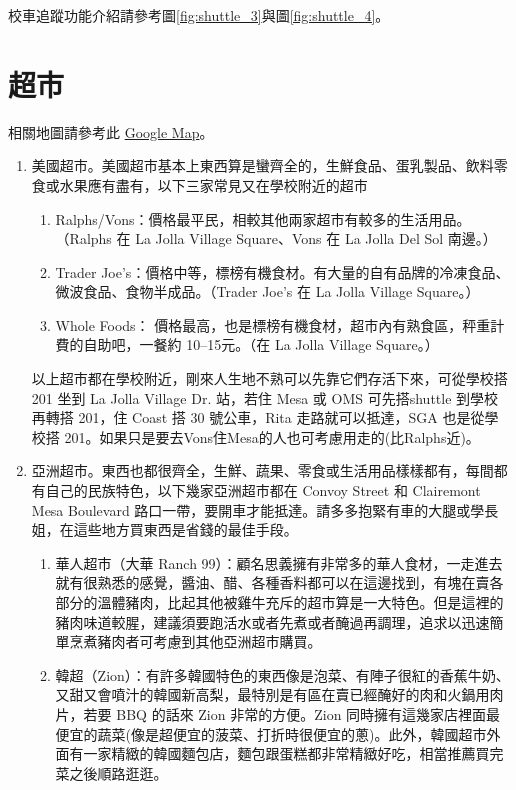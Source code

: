 \documentclass[10pt,a4paper]{book}
\begin{document}
\begin{CJK}{UTF8}{bkai}
校車追蹤功能介紹請參考圖\ref{fig:shuttle_3}與圖\ref{fig:shuttle_4}。

\section{超市}
\label{sec:supermarket}
相關地圖請參考此 \href{https://mapsengine.google.com/map/edit?mid=zQtEEXrWDims.k7LCNq-XBdbU}{Google Map}。

\begin{enumerate}
\item 美國超市。美國超市基本上東西算是蠻齊全的，生鮮食品、蛋乳製品、飲料零食或水果應有盡有，以下三家常見又在學校附近的超市

\begin{enumerate}
\item Ralphs/Vons：價格最平民，相較其他兩家超市有較多的生活用品。（Ralphs 在 La Jolla Village Square、Vons 在 La Jolla Del Sol 南邊。）
\item Trader Joe's：價格中等，標榜有機食材。有大量的自有品牌的冷凍食品、微波食品、食物半成品。（Trader Joe's 在 La Jolla Village Square。）
\item Whole Foods： 價格最高，也是標榜有機食材，超市內有熟食區，秤重計費的自助吧，一餐約 10--15元。（在 La Jolla Village Square。）
\end{enumerate}

以上超市都在學校附近，剛來人生地不熟可以先靠它們存活下來，可從學校搭 201 坐到 La Jolla Village Dr. 站，若住 Mesa 或 OMS 可先搭shuttle 到學校再轉搭 201，住 Coast 搭 30 號公車，Rita 走路就可以抵達，SGA 也是從學校搭 201。如果只是要去Vons住Mesa的人也可考慮用走的(比Ralphs近)。

\item 亞洲超市。東西也都很齊全，生鮮、蔬果、零食或生活用品樣樣都有，每間都有自己的民族特色，以下幾家亞洲超市都在 Convoy Street 和 Clairemont Mesa Boulevard 路口一帶，要開車才能抵達。請多多抱緊有車的大腿或學長姐，在這些地方買東西是省錢的最佳手段。

\begin{enumerate}
\item 華人超市（大華 Ranch 99）：顧名思義擁有非常多的華人食材，一走進去就有很熟悉的感覺，醬油、醋、各種香料都可以在這邊找到，有塊在賣各部分的溫體豬肉，比起其他被雞牛充斥的超市算是一大特色。但是這裡的豬肉味道較腥，建議須要跑活水或者先煮或者醃過再調理，追求以迅速簡單烹煮豬肉者可考慮到其他亞洲超市購買。

\item 韓超（Zion）：有許多韓國特色的東西像是泡菜、有陣子很紅的香蕉牛奶、又甜又會噴汁的韓國新高梨，最特別是有區在賣已經醃好的肉和火鍋用肉片，若要 BBQ 的話來 Zion 非常的方便。Zion 同時擁有這幾家店裡面最便宜的蔬菜(像是超便宜的菠菜、打折時很便宜的蔥)。此外，韓國超市外面有一家精緻的韓國麵包店，麵包跟蛋糕都非常精緻好吃，相當推薦買完菜之後順路逛逛。


\end{enumerate}
\end{enumerate}
\end{CJK}
\end{document}
